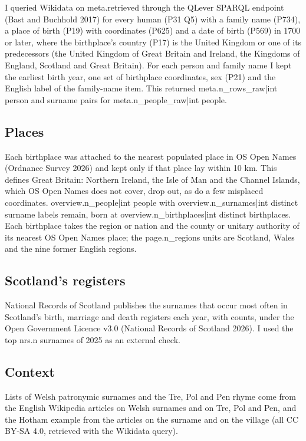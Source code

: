 \documentclass[11pt,a4paper]{article}
\begin{document}
I queried Wikidata on {{meta.retrieved}} through the QLever SPARQL endpoint (Bast and Buchhold 2017) for every human (P31 Q5) with a family name (P734), a place of birth (P19) with coordinates (P625) and a date of birth (P569) in 1700 or later, where the birthplace's country (P17) is the United Kingdom or one of its predecessors (the United Kingdom of Great Britain and Ireland, the Kingdoms of England, Scotland and Great Britain). For each person and family name I kept the earliest birth year, one set of birthplace coordinates, sex (P21) and the English label of the family-name item. This returned {{meta.n_rows_raw|int}} person and surname pairs for {{meta.n_people_raw|int}} people.

\subsection{Places}

Each birthplace was attached to the nearest populated place in OS Open Names (Ordnance Survey 2026) and kept only if that place lay within 10 km. This defines Great Britain: Northern Ireland, the Isle of Man and the Channel Islands, which OS Open Names does not cover, drop out, as do a few misplaced coordinates. {{overview.n_people|int}} people with {{overview.n_surnames|int}} distinct surname labels remain, born at {{overview.n_birthplaces|int}} distinct birthplaces. Each birthplace takes the region or nation and the county or unitary authority of its nearest OS Open Names place; the {{page.n_regions}} units are Scotland, Wales and the nine former English regions.

\subsection{Scotland's registers}

National Records of Scotland publishes the surnames that occur most often in Scotland's birth, marriage and death registers each year, with counts, under the Open Government Licence v3.0 (National Records of Scotland 2026). I used the top {{nrs.n}} surnames of 2025 as an external check.

\subsection{Context}

Lists of Welsh patronymic surnames and the Tre, Pol and Pen rhyme come from the English Wikipedia articles on Welsh surnames and on Tre, Pol and Pen, and the Hotham example from the articles on the surname and on the village (all CC BY-SA 4.0, retrieved with the Wikidata query).
\end{document}
